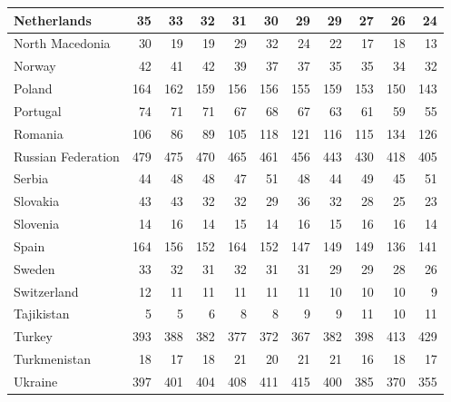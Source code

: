 \begin{table}
\begin{tabular}{|l|r|r|r|r|r|r|r|r|r|r|}
                   Netherlands&     35&     33&     32&     31&     30&     29&     29&     27&     26&     24\\\hline
               North Macedonia&     30&     19&     19&     29&     32&     24&     22&     17&     18&     13\\\hline
                        Norway&     42&     41&     42&     39&     37&     37&     35&     35&     34&     32\\\hline
                        Poland&    164&    162&    159&    156&    156&    155&    159&    153&    150&    143\\\hline
                      Portugal&     74&     71&     71&     67&     68&     67&     63&     61&     59&     55\\\hline
                       Romania&    106&     86&     89&    105&    118&    121&    116&    115&    134&    126\\\hline
            Russian Federation&    479&    475&    470&    465&    461&    456&    443&    430&    418&    405\\\hline
                        Serbia&     44&     48&     48&     47&     51&     48&     44&     49&     45&     51\\\hline
                      Slovakia&     43&     43&     32&     32&     29&     36&     32&     28&     25&     23\\\hline
                      Slovenia&     14&     16&     14&     15&     14&     16&     15&     16&     16&     14\\\hline
                         Spain&    164&    156&    152&    164&    152&    147&    149&    149&    136&    141\\\hline
                        Sweden&     33&     32&     31&     32&     31&     31&     29&     29&     28&     26\\\hline
                   Switzerland&     12&     11&     11&     11&     11&     11&     10&     10&     10&      9\\\hline
                    Tajikistan&      5&      5&      6&      8&      8&      9&      9&     11&     10&     11\\\hline
                        Turkey&    393&    388&    382&    377&    372&    367&    382&    398&    413&    429\\\hline
                  Turkmenistan&     18&     17&     18&     21&     20&     21&     21&     16&     18&     17\\\hline
                       Ukraine&    397&    401&    404&    408&    411&    415&    400&    385&    370&    355\\\hline

\end{tabular}
\end{table}
